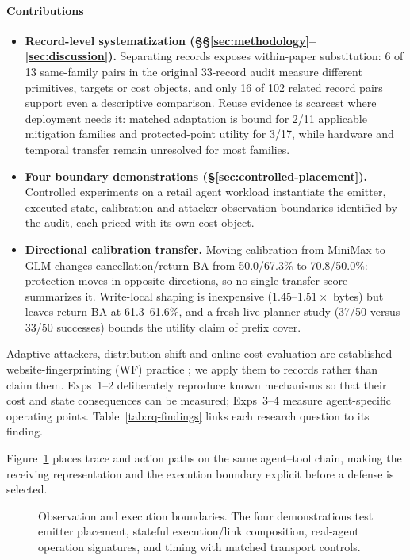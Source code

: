 \paragraph{Contributions}
\begin{itemize}
\item \textbf{Record-level systematization (\S\S\ref{sec:methodology}--\ref{sec:discussion}).} Separating records exposes within-paper substitution: 6 of 13 same-family pairs in the original 33-record audit measure different primitives, targets or cost objects, and only 16 of 102 related record pairs support even a descriptive comparison. Reuse evidence is scarcest where deployment needs it: matched adaptation is bound for 2/11 applicable mitigation families and protected-point utility for 3/17, while hardware and temporal transfer remain unresolved for most families.
\item \textbf{Four boundary demonstrations (\S\ref{sec:controlled-placement}).} Controlled experiments on a retail agent workload instantiate the emitter, executed-state, calibration and attacker-observation boundaries identified by the audit, each priced with its own cost object.
\item \textbf{Directional calibration transfer.} Moving calibration from MiniMax to GLM changes cancellation/return BA from 50.0/67.3\% to 70.8/50.0\%: protection moves in opposite directions, so no single transfer score summarizes it. Write-local shaping is inexpensive ($1.45$--$1.51\times$ bytes) but leaves return BA at 61.3--61.6\%, and a fresh live-planner study (37/50 versus 33/50 successes) bounds the utility claim of prefix cover.
\end{itemize}
Adaptive attackers, distribution shift and online cost evaluation are established website-fingerprinting (WF) practice \cite{juarez2014critical,mathews2023critical}; we apply them to records rather than claim them. Exps~1--2 deliberately reproduce known mechanisms so that their cost and state consequences can be measured; Exps~3--4 measure agent-specific operating points. Table~\ref{tab:rq-findings} links each research question to its finding.



Figure~\ref{fig:system-model} places trace and action paths on the same agent--tool chain, making the receiving representation and the execution boundary explicit before a defense is selected.
\begin{figure}[t]
\centering
\caption{Observation and execution boundaries. The four demonstrations test emitter placement, stateful execution/link composition, real-agent operation signatures, and timing with matched transport controls.}
\label{fig:system-model}
\end{figure}
